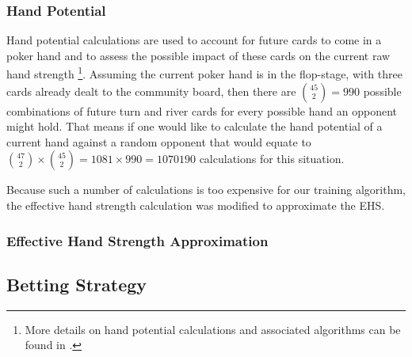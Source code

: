 \subsubsection{Hand Potential}
\label{subsubsec:hp}
Hand potential calculations are used to account for future cards to come in a poker hand and to assess the possible impact of these cards on the current raw hand strength \cite{challenge_of_poker}\footnote{More details on hand potential calculations and associated algorithms can be found in \cite[p. 216-218]{challenge_of_poker}.}.  
Assuming the current poker hand is in the flop-stage, with three cards already dealt to the community board, then there are ${45\choose 2} = 990$ possible combinations of future turn and river cards for every possible hand an opponent might hold. That means if one would like to calculate the hand potential of a current hand against a random opponent that would equate to ${47\choose 2} \times {45\choose 2} = 1081 \times 990 = 1070190$ calculations for this situation. \par
Because such a number of calculations is too expensive for our training algorithm, the effective hand strength calculation was modified to approximate the EHS.
\subsubsection{Effective Hand Strength Approximation}
\pagebreak
\subsection{Betting Strategy}
\label{subsec:betting}
\pagebreak

